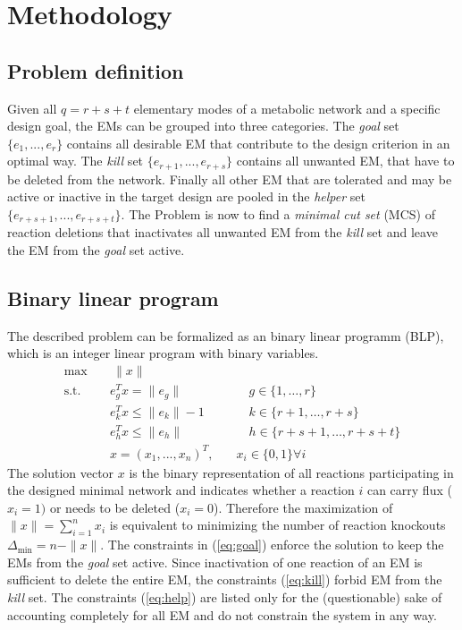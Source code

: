 \documentclass{llncs}
\begin{document}
\section{Methodology}
\subsection{Problem definition}
Given all $q = r+s+t$ elementary modes of a metabolic network and a specific design goal,
the EMs can be grouped into three categories.
The \emph{goal} set $\{e_{1}, ..., e_{r}\}$ contains all desirable EM that contribute 
to the design criterion in an optimal way.
The \emph{kill} set $\{e_{r+1}, ..., e_{r+s}\}$ contains all unwanted EM, 
that have to be deleted from the network.
Finally all other EM that are tolerated and may be active or inactive in 
the target design are pooled in the \emph{helper} set $\{e_{r+s+1}, ..., e_{r+s+t}\}$.
The Problem is now to find a \emph{minimal cut set} (MCS) of reaction deletions 
that inactivates all unwanted EM from the \emph{kill} set and leave the 
EM from the \emph{goal} set active.

\subsection{Binary linear program}
The described problem can be formalized as an binary linear programm (BLP), 
which is an integer linear program with binary variables.
\begin{subequations}
    \begin{align}
        \max \quad  & ~\|x\|    \label{eq:objfunc}\\
        \mbox{s.t.}\quad  & e^{T}_{g} x = \|e_{g}\| &\quad\quad g \in \{1, \dots, r\}   \label{eq:goal} \\
        & e^{T}_{k} x \leq \|e_{k}\|-1     &\quad\quad k \in \{r+1, \dots, r+s\}  \label{eq:kill} \\
        & e^{T}_{h} x \leq \|e_{h}\|       &\quad\quad h \in \{r+s+1, \dots, r+s+t\}  \label{eq:help} \\
        & x = (x_{1}, ..., x_{n})^{T}, &\quad x_{i} \in \{0, 1\} \forall i
        \end{align}
\end{subequations}
The solution vector $x$ is the binary representation of all reactions 
participating in the designed minimal network and indicates whether a reaction
$i$ can carry flux ($x_{i} = 1)$ or needs to be deleted ($x_{i} = 0$).
Therefore the maximization of $\|x\| = \sum_{i=1}^{n} x_{i}$ is equivalent
to minimizing the number of reaction knockouts $\Delta_{\min} = n - \|x\|$.
The constraints in (\ref{eq:goal}) enforce the solution to keep the 
EMs from the \emph{goal} set active. 
Since inactivation of one reaction of an EM is sufficient to delete the
entire EM, the constraints (\ref{eq:kill}) forbid EM from the \emph{kill} set.
The constraints (\ref{eq:help}) are listed only for the (questionable) 
sake of accounting completely for all EM
and do not constrain the system in any way.
 
\end{document}
